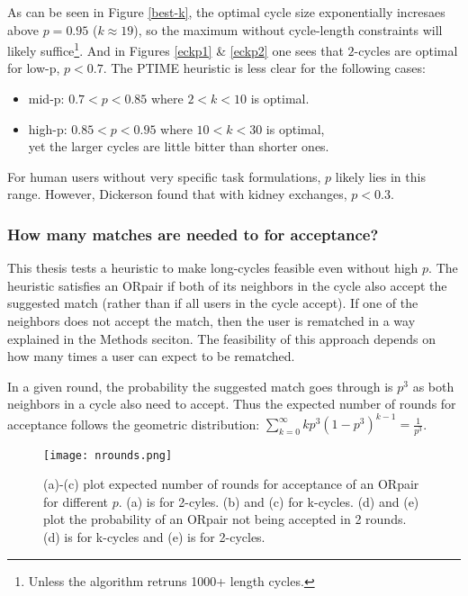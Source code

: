 \documentclass[main.tex]{subfiles}
\begin{document}
As can be seen in Figure \ref{best-k}, the optimal cycle size exponentially incresaes above $p = 0.95$ ($k \approx 19$), so the maximum without cycle-length constraints will likely suffice\footnote{Unless the algorithm retruns 1000+ length cycles.}. And in Figures \ref{eckp1} \& \ref{eckp2} one sees that $2$-cycles are optimal for low-p, $p < 0.7$. The PTIME heuristic is less clear for the following cases:
\begin{itemize}
  \item mid-p: $0.7 < p < 0.85$ where $ 2 < k < 10$ is optimal.
  \item high-p: $0.85 < p < 0.95$ where $ 10 < k < 30$ is optimal,
      \\yet the larger cycles are little bitter than shorter ones.
\end{itemize}

For human users without very specific task formulations, $p$ likely lies in this range. However, Dickerson \cite{Dick} \cite{Dick3} found that with kidney exchanges, $p < 0.3$.

\subsubsection{How many matches are needed to for acceptance?}\label{sec:nrounds}
This thesis tests a heuristic to make long-cycles feasible even without high $p$. The heuristic satisfies an ORpair if both of its neighbors in the cycle also accept the suggested match (rather than if all users in the cycle accept). If one of the neighbors does not accept the match, then the user is rematched in a way explained in the Methods seciton. The feasibility of this approach depends on how many times a user can expect to be rematched.

In a given round, the probability the suggested match goes through is $p^3$ as both neighbors in a cycle also need to accept. Thus the expected number of rounds for acceptance follows the geometric distribution: $\sum_{k=0}^{\infty} k p^3 (1 - p^3)^{k-1} = \frac{1}{p^3}$.

\begin{figure}
  \texttt{[image: nrounds.png]}
  \caption{(a)-(c) plot expected number of rounds for acceptance of an ORpair for different $p$. (a) is for 2-cyles. (b) and (c) for k-cycles. (d) and (e) plot the probability of an ORpair not being accepted in 2 rounds. (d) is for k-cycles and (e) is for 2-cycles.}
  \label{nrounds}
\end{figure}
\end{document}
